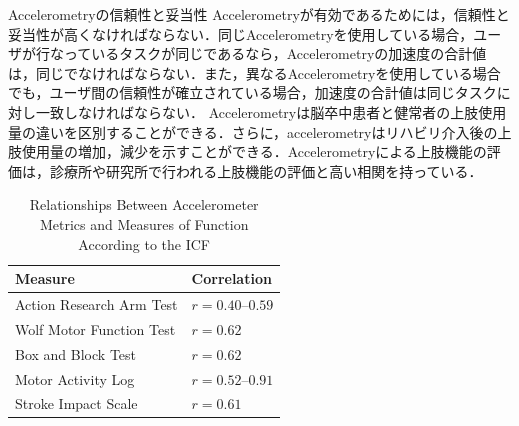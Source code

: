 Accelerometryの信頼性と妥当性
Accelerometryが有効であるためには，信頼性と妥当性が高くなければならない．\cite{}同じAccelerometryを使用している場合，ユーザが行なっているタスクが同じであるなら，Accelerometryの加速度の合計値は，同じでなければならない．また，異なるAccelerometryを使用している場合でも，ユーザ間の信頼性が確立されている場合，加速度の合計値は同じタスクに対し一致しなければならない．
Accelerometryは脳卒中患者と健常者の上肢使用量の違いを区別することができる．さらに，accelerometryはリハビリ介入後の上肢使用量の増加，減少を示すことができる．Accelerometryによる上肢機能の評価は，診療所や研究所で行われる上肢機能の評価と高い相関を持っている．

\begin{table}[H]
  \caption{Relationships Between Accelerometer Metrics and Measures of Function According to the ICF}
  \label{table:measure}
  \centering
  \begin{tabular}{ll}
    \hline
    Measure & Correlation\\
    \hline \hline
    Action Research Arm Test &$r = 0.40–0.59$\cite{Lang2007,Rand2012}\\
    Wolf Motor Function Test &$r = 0.62$\cite{Lang2007}\\
    Box and Block Test &$r = 0.62$\cite{Rand2012}\\
    Motor Activity Log &$r = 0.52–0.91$\cite{Uswatte2000,Uswatte2005,Uswatte2006}\\
    Stroke Impact Scale &$r = 0.61$\cite{Rand2012}\\
    \hline
  \end{tabular}
\end{table}



